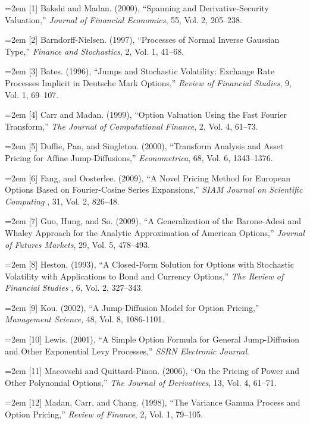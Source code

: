 \begin{flushleft}
\hangindent=2em
[1] Bakshi and Madan. (2000), “Spanning and Derivative-Security Valuation,” \emph{Journal of Financial Economics}, 55, Vol. 2, 205–238.

\hangindent=2em
[2] Barndorff-Nielsen. (1997), “Processes of Normal Inverse Gaussian Type,” \emph{Finance and Stochastics}, 2, Vol. 1, 41–68.

\hangindent=2em
[3] Bates. (1996), “Jumps and Stochastic Volatility: Exchange Rate Processes Implicit in Deutsche Mark Options,” \emph{Review of Financial Studies}, 9, Vol. 1, 69–107. 

\hangindent=2em
[4] Carr and Madan. (1999), “Option Valuation Using the Fast Fourier Transform,” \emph{The Journal of Computational Finance}, 2, Vol. 4, 61–73.

\hangindent=2em
[5] Duffie, Pan, and Singleton. (2000), “Transform Analysis and Asset Pricing for Affine Jump-Diffusions,” \emph{Econometrica}, 68, Vol. 6, 1343–1376. 

\hangindent=2em
[6] Fang, and Oosterlee. (2009), “A Novel Pricing Method for European Options Based on Fourier-Cosine Series Expansions,” \emph{SIAM Journal on Scientific Computing }, 31, Vol. 2, 826–48.

\hangindent=2em
[7] Guo, Hung, and So. (2009), “A Generalization of the Barone-Adesi and Whaley Approach for the Analytic Approximation of American Options,” \emph{Journal of Futures Markets}, 29, Vol. 5, 478–493.

\hangindent=2em
[8] Heston. (1993), “A Closed-Form Solution for Options with Stochastic Volatility with Applications to Bond and Currency Options,” \emph{The Review of Financial Studies }, 6, Vol. 2, 327–343.

\hangindent=2em
[9] Kou. (2002), “A Jump-Diffusion Model for Option Pricing,” \emph{Management Science}, 48, Vol. 8, 1086-1101.

\hangindent=2em
[10] Lewis. (2001), “A Simple Option Formula for General Jump-Diffusion and Other Exponential Levy Processes,” \emph{SSRN Electronic Journal}. 

\hangindent=2em
[11] Macovschi and Quittard-Pinon. (2006), “On the Pricing of Power and Other Polynomial Options,” \emph{The Journal of Derivatives}, 13, Vol. 4, 61–71.

\hangindent=2em
[12] Madan, Carr, and Chang. (1998), “The Variance Gamma Process and Option Pricing,” \emph{Review of Finance}, 2, Vol. 1, 79–105.


\end{flushleft}
